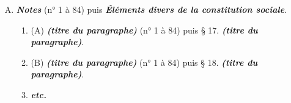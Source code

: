 \begin{enumerate}[A.]
\begin{enumerate}[I.]
\begin{enumerate}[]
            \item \textit{§ 10. Habitation, mobilier et vêtements.}
            \item \textit{§ 11. Récréations.}
        \end{enumerate}
        \item \textbf{\textit{Histoire de la famille.}}
        \begin{enumerate}[]
            \item \textit{§ 12. Phases principales de l'existence.}
            \item \textit{§ 13. M\oe{}urs et institutions assurant le bien-être physique et moral de la famille.}
        \end{enumerate}
        \item (\textbf{\textit{Budget domestique annuel}}\footnote{Cette section ne possède un titre que dans huit monographies}).
        \begin{enumerate}[]
            \item \textit{§ 14. Budget des recettes de l'année.}
            \item \textit{§ 15. Budget des dépenses de l'année.}
            \item \textit{Comptes annexés aux budgets} \footnotesize{(n° 1 à 84) puis} \textit{§ 16. Comptes annexés aux budgets.}
        \end{enumerate}
    \end{enumerate}
    \item \textbf{\textit{Notes}} \footnotesize{(n° 1 à 84) puis} \textbf{\textit{Éléments divers de la constitution sociale}}.
    \begin{enumerate}[]
            \item (A) \textbf{\textit{(titre du paragraphe)}} \footnotesize{(n° 1 à 84) puis} § 17. \textbf{\textit{(titre du paragraphe)}}.
            \item (B) \textbf{\textit{(titre du paragraphe)}} \footnotesize{(n° 1 à 84) puis} § 18. \textbf{\textit{(titre du paragraphe)}}.
            \item \textbf{\textit{etc.}}
        \end{enumerate}
\end{enumerate}